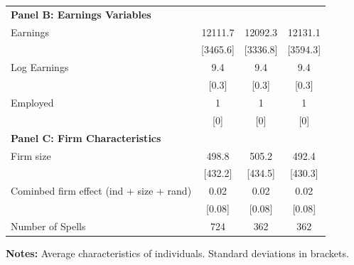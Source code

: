 \documentclass{article}
\begin{document}
\begin{table}[p]
\begin{threeparttable}
\begin{tabular}{l *{3}{c}}
 \multicolumn{4}{l}{\textbf{Panel B: Earnings Variables}} \\ 
Earnings                                                &             12111.7 &             12092.3 &             12131.1 \\ 
                                                        &            [3465.6] &            [3336.8] &            [3594.3] \\ 
Log Earnings                                            &                 9.4 &                 9.4 &                 9.4 \\ 
                                                        &               [0.3] &               [0.3] &               [0.3] \\ 
Employed                                                &                   1 &                   1 &                   1 \\ 
                                                        &                 [0] &                 [0] &                 [0] \\ 
 \multicolumn{4}{l}{\textbf{Panel C: Firm Characteristics}} \\ 
Firm size                                               &               498.8 &               505.2 &               492.4 \\ 
                                                        &             [432.2] &             [434.5] &             [430.3] \\ 
Cominbed firm effect (ind + size + rand)                &                0.02 &                0.02 &                0.02 \\ 
                                                        &              [0.08] &              [0.08] &              [0.08] \\ 
\addlinespace
Number of Spells                                        &                 724 &                 362 &                 362 \\
\bottomrule
\end{tabular}
\textbf{Notes:} Average characteristics of individuals.
Standard deviations in brackets. 
\end{threeparttable} 
\end{table}
\clearpage 
 
\end{document}

